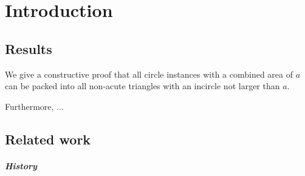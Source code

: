 \chapter{Introduction}

%
%
%
%
%
%


\section{Results}

We give a constructive proof that all circle instances with a combined area of $a$ can be packed into all non-acute triangles with an incircle not larger than $a$.

Furthermore, ...

\section{Related work}

\paragraph{History}

